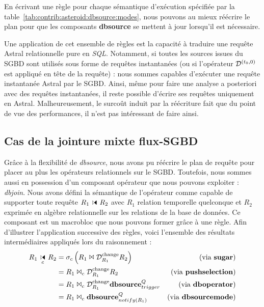 En écrivant une règle pour chaque sémantique d'exécution spécifiée par la table~\ref{tab:contrib:asteroid:dbsource:modes}, nous pouvons au mieux réécrire le plan pour que les composants \textbf{dbsource} se mettent à jour lorsqu'il est nécessaire.

Une application de cet ensemble de règles est la capacité à traduire une requête Astral relationnelle pure en \textit{SQL}. Notamment, si toutes les sources issues du SGBD sont utilisés sous forme de requêtes instantanées (ou si l'opérateur $\mathcal{D}^{(t_0,0)}$ est appliqué en tête de la requête) : nous sommes capables d'exécuter une requête instantanée Astral par le SGBD. Ainsi, même pour faire une analyse a posteriori avec des requêtes instantanées, il reste possible d'écrire ses requêtes uniquement en Astral. Malheureusement, le surcoût induit par la réécriture fait que du point de vue des performances, il n'est pas intéressant de faire ainsi.

\subsection{Cas de la jointure mixte flux-SGBD}\label{sec:contrib:asteroid:reecriture:join}
Grâce à la flexibilité de \textit{dbsource}, nous avons pu réécrire le plan de requête pour placer au plus les opérateurs relationnels sur le SGBD. Toutefois, nous sommes aussi en possession d'un composant opérateur que nous pouvons exploiter : \textit{dbjoin}. Nous avons défini la sémantique de l'opérateur comme capable de supporter toute requête $R_1\ssjoin R_2$ avec $R_1$ relation temporelle quelconque et $R_2$ exprimée en algèbre relationnelle sur les relations de la base de données. Ce composant est un macrobloc que nous pouvons former grâce à une règle. Afin d'illustrer l'application successive des règles, voici l'ensemble des résultats intermédiaires appliqués lors du raisonnement :
\begin{align*} 
R_1\ssjoin_c R_2 &= \sigma_c \left(R_1 \Join \D^{\mathrm{change}}_{R_1} R_2\right) & \text{(via \textbf{sugar})}\\
& =  R_1 \Join_c \D^{\mathrm{change}}_{R_1} R_2 & \text{(via \textbf{pushselection})}\\
& =  R_1 \Join_c \D^{\mathrm{change}}_{R_1} \textbf{dbsource}_{trigger}^{Q} & \text{(via \textbf{dboperator})}\\
& =  R_1 \Join_c \textbf{dbsource}_{notify(R_1)}^{Q} & \text{(via \textbf{dbsourcemode})}
\end{align*}

